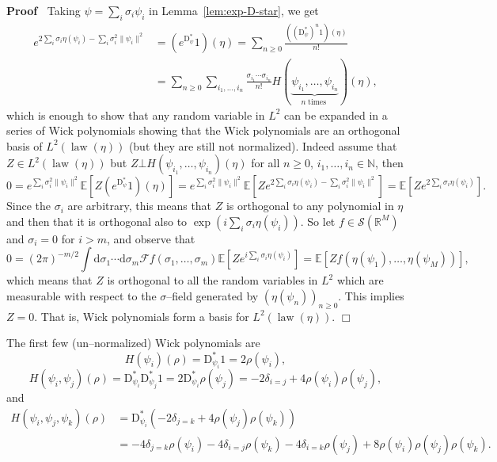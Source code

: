 \documentclass[a4paper,11pt]{article}
\newcommand{\mathD}{\mathrm{D}}
\newcommand{\mathd}{\mathrm{d}}
\newcommand{\tmop}[1]{\ensuremath{\operatorname{#1}}}
\newenvironment{proof}{\noindent\textbf{Proof\ }}{\hspace*{\fill}$\Box$\medskip}
\newcommand{\CF}{\mathscr{F}}
\newcommand{\CS}{\mathscr{S}}
\begin{document}
\begin{proof}
  Taking $\psi = \sum_i \sigma_i \psi_i$ in Lemma~\ref{lem:exp-D-star}, we get
  \begin{align*}
     e^{2 \sum_i \sigma_i \eta (\psi_i) - \sum_i \sigma_i^2 \| \psi_i \|^2} & = (e^{\mathD^{\ast}_{\psi}} 1) (\eta) = \sum_{n \geqslant 0} \frac{((\mathD^{\ast}_{\psi})^n 1) (\eta)}{n!} \\
     & = \sum_{n \geqslant 0} \sum_{i_1, \ldots, i_n} \frac{\sigma_{i_1} \cdots \sigma_{i_n}}{n!} H(\underbrace{_{} \psi_{i_1}, \ldots, \psi_{i_n}}_{n \tmop{times}})(\eta),
  \end{align*}
  which is enough to show that any random variable in $L^2$ can be expanded in
  a series of Wick polynomials showing that the Wick polynomials are an
  orthogonal basis of $L^2 (\tmop{law} (\eta))$ (but they are still not
  normalized). Indeed assume that $Z \in L^2 (\tmop{law} (\eta))$ but $Z \bot
  H (\psi_{i_1}, \ldots, \psi_{i_n}) (\eta)$ for all $n \geqslant 0$, $i_1,
  \ldots, i_n \in \mathbb{N}$, then
  \[ 0 = e^{\sum_i \sigma_i^2 \| \psi_i \|^2} \mathbb{E} [Z
     (e^{\mathD^{\ast}_{\psi}} 1) (\eta)] = e^{\sum_i \sigma_i^2 \| \psi_i
     \|^2} \mathbb{E} [Z e^{2 \sum_i \sigma_i \eta (\psi_i) - \sum_i
     \sigma_i^2 \| \psi_i \|^2}] =\mathbb{E} [Z e^{2 \sum_i \sigma_i \eta
     (\psi_i)}] . \]
  Since the $\sigma_i$ are arbitrary, this means that $Z$ is orthogonal to any
  polynomial in $\eta$ and then that it is orthogonal also to $\exp \left( i
  \sum_i \sigma_i \eta (\psi_i) \right)$. So let $f \in \CS (\mathbb{R}^M)$
  and $\sigma_i = 0$ for $i > m$, and observe that
  \[ 0 = (2 \pi)^{- m / 2} \int \mathd \sigma_1 \cdots \mathd \sigma_m \CF f
     (\sigma_1, \ldots, \sigma_m) \mathbb{E} [Z e^{i \sum_i \sigma_i \eta
     (\psi_i)}] =\mathbb{E} [Z f (\eta (\psi_1), \ldots, \eta (\psi_M))], \]
  which means that $Z$ is orthogonal to all the random variables in $L^2$
  which are measurable with respect to the $\sigma$--field generated by $(\eta
  (\psi_n))_{n \geqslant 0}$. This implies $Z = 0$. That is, Wick polynomials
  form a basis for $L^2 (\tmop{law} (\eta))$.
\end{proof}

\begin{example}
  The first few (un--normalized) Wick polynomials are
  \[ H (\psi_i) (\rho) = \mathD^{\ast}_{\psi_i} 1 = 2 \rho (\psi_i), \]
  \[ H (\psi_i, \psi_j) (\rho) = \mathD^{\ast}_{\psi_i} \mathD^{\ast}_{\psi_j}
     1 = 2 \mathD^{\ast}_{\psi_i} \rho (\psi_j) = - 2 \delta_{i = j} + 4 \rho
     (\psi_i) \rho (\psi_j), \]
  and
  \begin{align*}
     H (\psi_i, \psi_j, \psi_k) (\rho) & = \mathD^{\ast}_{\psi_i} (- 2 \delta_{j= k} + 4 \rho (\psi_j) \rho (\psi_k)) \\
     & = - 4 \delta_{j = k} \rho (\psi_i) - 4 \delta_{i = j} \rho (\psi_k) - 4 \delta_{i = k} \rho (\psi_j) + 8 \rho (\psi_i) \rho (\psi_j) \rho (\psi_k).
  \end{align*}
\end{example}
\end{document}
